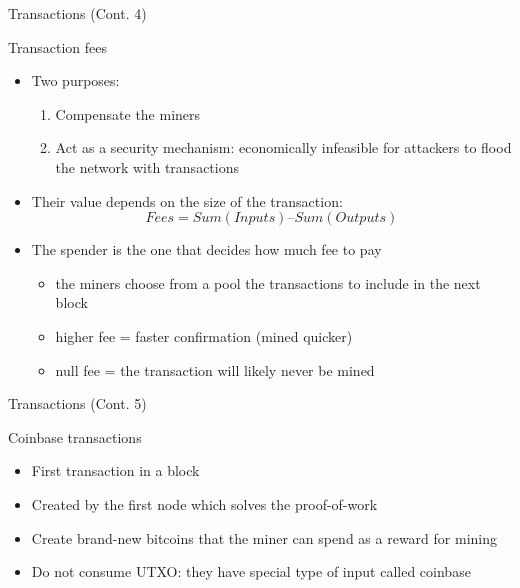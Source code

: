 \documentclass{beamer}
\begin{document}
  \begin{frame}{Transactions (Cont. 4)}
    \begin{block}{Transaction fees}
      \begin{itemize}
        \item Two purposes:
        \begin{enumerate}
          \item Compensate the miners 
          \item Act as a security mechanism: economically infeasible for attackers to flood the network with transactions 
        \end{enumerate}
        \item Their value depends on the size of the transaction:
        \[ Fees = Sum(Inputs)–Sum(Outputs) \] 
        \item The spender is the one that decides how much fee to pay
        \begin{itemize}
            \item the miners choose from a pool the transactions to include in the next block
            \item higher fee = faster confirmation (mined quicker)
            \item null fee = the transaction will likely never be mined
        \end{itemize}
      \end{itemize}
    \end{block}
  \end{frame}





  \begin{frame}{Transactions (Cont. 5)}
    \begin{block}{Coinbase transactions}
      \begin{itemize}
        \item First transaction in a block 
        \item Created by the first node which solves the proof-of-work 
        \item Create brand-new bitcoins that the miner can spend as a reward for mining
        \item Do not consume UTXO: they have special type of input called coinbase
      \end{itemize}
    \end{block}
  \end{frame}
\end{document}
